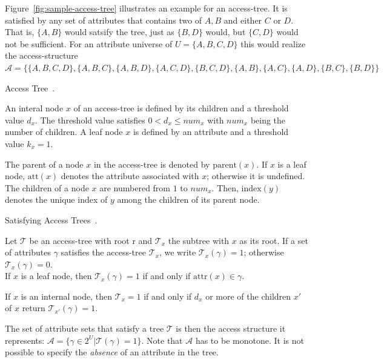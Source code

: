 Figure~\ref{fig:sample-access-tree} illustrates an example for an \gls{access-tree}. It is satisfied by any set of attributes that contains two of $A, B$ and either $C$ or $D$.
That is, $\{A,B\}$ would satsify the tree, just as $\{B, D\}$ would, but $\{C, D\}$ would not be sufficient.
For an attribute universe of $U = \{A, B, C, D\}$ this would realize the \gls{access-structure} $\mathcal{A} = \{\{A, B, C, D\}, \{A, B, C\}, \{A, B, D\},\{A, C, D\}, \{B, C, D\}, \{A, B\},\{A, C\},\{A,D\}, \{B, C\},\{B, D\}\}$

\begin{definition}
    Access Tree~\cite{goyal_attribute-based_2006}.

    An interal node $x$ of an \gls{access-tree} is defined by its children and a threshold value $d_x$.
    The threshold value satisfies $0 < d_x \leq num_x$ with $num_x$ being the number of children.
    A leaf node $x$ is defined by an attribute and a threshold value $k_x = 1$.

    The parent of a node $x$ in the \gls{access-tree} is denoted by $\text{parent}(x)$.
    If $x$ is a leaf node, $\text{att}(x)$ denotes the attribute associated with $x$; otherwise it is undefined.
    The children of a node $x$ are numbered from $1$ to $num_x$. Then, $\text{index}(y)$ denotes the unique index of $y$ among the children of its parent node.
\end{definition}

\begin{definition}
    Satisfying Access Trees~\cite{goyal_attribute-based_2006}.

    Let $\mathcal{T}$ be an \gls{access-tree} with root r and $\mathcal{T}_x$ the subtree with $x$ as its root.
    If a set of attributes $\gamma$ satisfies the \gls{access-tree} $\mathcal{T}_x$, we write $\mathcal{T}_x(\gamma) = 1$; otherwise $\mathcal{T}_x(\gamma) = 0$.\\
    If $x$ is a leaf node, then $\mathcal{T}_x(\gamma) = 1$ if and only if $\text{attr}(x) \in \gamma$.
    
    If $x$ is an internal node, then $\mathcal{T}_x = 1$ if and only if $d_x$ or more of the children $x'$ of $x$ return $\mathcal{T}_{x'}(\gamma) = 1$.
\end{definition}
The set of attribute sets that satisfy a tree $\mathcal{T}$ is then the access structure it represents: $\mathcal{A} = \{\gamma \in 2^U | \mathcal{T}(\gamma) = 1\}$.
Note that $\mathcal{A}$ has to be monotone. It is not possible to specify the \emph{absence} of an attribute in the tree.

